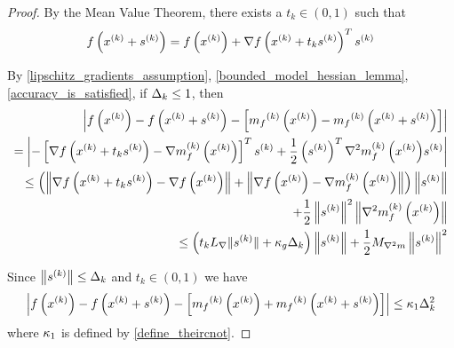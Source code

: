 
 

\begin{proof}
By the Mean Value Theorem, there exists a $t_k \in (0, 1)$ such that
\begin{align*}
f\left(x^{(k)} + {{s}^{(k)}}\right) = f\left(x^{(k)}\right) + \nabla f\left(x^{(k)} + t_k{{s}^{(k)}}\right)^T{{s}^{(k)}}
\end{align*}

By \cref{lipschitz_gradients_assumption}, \cref{bounded_model_hessian_lemma}, \cref{accuracy_is_satisfied}, if $\Delta_k \le 1$, then
\begin{align*}
\left|f\left(x^{(k)}\right) - f\left(x^{(k)} + {{s}^{(k)}}\right) - \left[{{m}_f}^{(k)}\left(x^{(k)}\right) - {{m}_f}^{(k)}\left(x^{(k)} + {{s}^{(k)}}\right)\right]\right| \\
= \left|-\left[\nabla f\left(x^{(k)} + t_k{{s}^{(k)}}\right) - {\nabla m_f^{(k)}\left(x^{(k)}\right)}\right]^T{{s}^{(k)}} + \frac 1 2 \left({{s}^{(k)}}\right)^T {\nabla^2m_f^{(k)}\left(x^{(k)}\right)} {{s}^{(k)}}\right| \\
\le \left(\left\| \nabla f\left(x^{(k)} + t_k{{s}^{(k)}}\right) - \nabla f\left(x^{(k)}\right) \right\| 
+ \left\| \nabla f\left(x^{(k)}\right)-{\nabla m_f^{(k)}\left(x^{(k)}\right)} \right\|\right) \left\|{{s}^{(k)}}\right\| \\
+ \frac 1 2 \left\|{{s}^{(k)}}\right\|^2\left\|{\nabla^2m_f^{(k)}\left(x^{(k)}\right)}\right\| \\
\le \left(t_k {L_{\nabla}} \|{{s}^{(k)}}\| + \kappa_{g}\Delta_k\right) \left\|{{s}^{(k)}}\right\| + \frac 1 2 {M_{\nabla^2 m}} \left\|{{s}^{(k)}}\right\|^2
\end{align*}

Since $\left\| {{s}^{(k)}} \right\| \le \Delta_k$ and $t_k \in (0, 1)$ we have
\begin{align*}
\left|f\left(x^{(k)}\right) - f\left(x^{(k)} + {{s}^{(k)}}\right) - \left[{{m}_f}^{(k)}\left(x^{(k)}\right) + {{m}_f}^{(k)}\left(x^{(k)} + {{s}^{(k)}}\right)\right]\right| \le {\kappa_1} \Delta_k^2
\end{align*}
where ${\kappa_1}$ is defined by \cref{define_theircnot}.


\end{proof}

